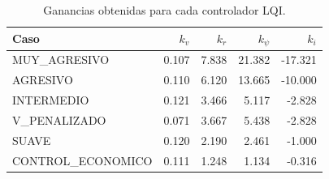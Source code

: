 \begin{table}[H]
\centering
\caption{Ganancias obtenidas para cada controlador LQI.}
\label{tab:parte-c-ganancias}
\small
\begin{tabular}{lrrrr}
\toprule
Caso & $k_v$ & $k_r$ & $k_\psi$ & $k_i$ \\
\midrule
MUY\_AGRESIVO & 0.107 & 7.838 & 21.382 & -17.321 \\
AGRESIVO & 0.110 & 6.120 & 13.665 & -10.000 \\
INTERMEDIO & 0.121 & 3.466 & 5.117 & -2.828 \\
V\_PENALIZADO & 0.071 & 3.667 & 5.438 & -2.828 \\
SUAVE & 0.120 & 2.190 & 2.461 & -1.000 \\
CONTROL\_ECONOMICO & 0.111 & 1.248 & 1.134 & -0.316 \\
\bottomrule
\end{tabular}
\end{table}
